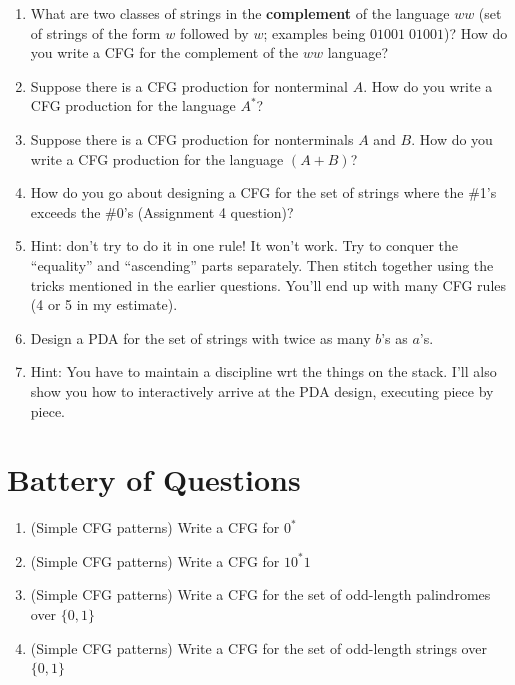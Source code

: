 \documentclass[12pt]{article}
\begin{document}
\begin{large}
\begin{enumerate}
\item What are two classes of strings in the {\bf complement} of the language $ww$ (set of strings of the
  form $w$ followed by $w$; examples being $01001 \; 01001$)?
  How do you write a CFG for the complement of the $ww$ language?

\item Suppose there is a CFG production for nonterminal $A$. How do you write a CFG production
  for the language $A^*$?

\item Suppose there is a CFG production for nonterminals $A$ and $B$. How do you write a CFG production
  for the language $(A+B)$?

\item How do you go about designing a CFG for the set of strings where the \#1's exceeds the \#0's (Assignment 4 question)?
\item[] Hint: don't try to do it in one rule! It won't work. Try to conquer the ``equality'' and ``ascending'' parts
  separately. Then stitch together using the tricks mentioned in the earlier questions. You'll end up with many CFG
  rules (4 or 5 in my estimate).

\item Design a PDA for the set of strings with twice as many $b$'s as $a$'s.
\item[] Hint: You have to maintain a discipline wrt the things on the stack. I'll also show you how to interactively arrive
  at the PDA design, executing piece by piece.

\end{enumerate}

\section{Battery of Questions}


\begin{enumerate}
  
\item (Simple CFG patterns)
Write a CFG for $0^*$


\item (Simple CFG patterns)
  Write a CFG for $10^*1$


\item (Simple CFG patterns)
  Write a CFG for the set of odd-length palindromes over $\{0,1\}$


\item (Simple CFG patterns)
  Write a CFG for the set of odd-length strings over $\{0,1\}$



\end{enumerate}
\end{large}
\end{document}
